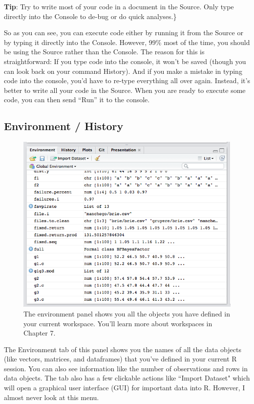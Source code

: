 \documentclass[]{book}
\theoremstyle{definition}
\theoremstyle{definition}
\theoremstyle{remark}
\begin{document}
\textbf{Tip}: Try to write most of your code in a document in the
Source. Only type directly into the Console to de-bug or do quick
analyses.\}

So as you can see, you can execute code either by running it from the
Source or by typing it directly into the Console. However, 99\% most of
the time, you should be using the Source rather than the Console. The
reason for this is straightforward: If you type code into the console,
it won't be saved (though you can look back on your command History).
And if you make a mistake in typing code into the console, you'd have to
re-type everything all over again. Instead, it's better to write all
your code in the Source. When you are ready to execute some code, you
can then send ``Run'' it to the console.

\subsection{Environment / History}\label{environment-history}

\begin{figure}
\includegraphics[width=600px]{images/environmentss} \caption{The environment panel shows you all the objects you have defined in your current workspace. You'll learn more about workspaces in Chapter 7.}\label{fig:environment}
\end{figure}

The Environment tab of this panel shows you the names of all the data
objects (like vectors, matrices, and dataframes) that you've defined in
your current R session. You can also see information like the number of
observations and rows in data objects. The tab also has a few clickable
actions like ``Import Dataset" which will open a graphical user
interface (GUI) for important data into R. However, I almost never look
at this menu.
\end{document}

